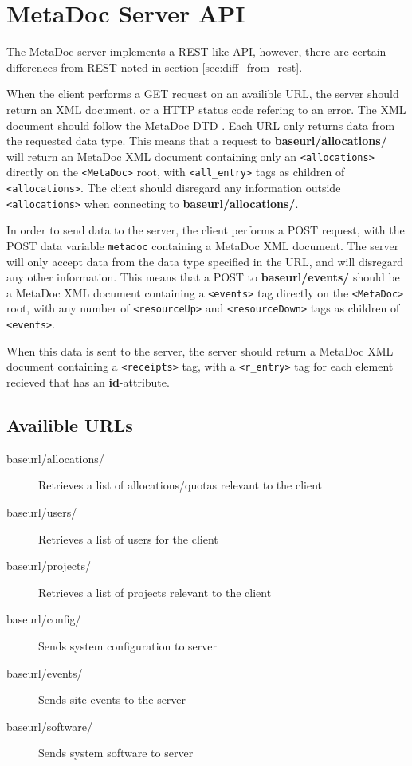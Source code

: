 \newpage
\section{MetaDoc Server API}
\label{sec:server_api}

The MetaDoc server implements a REST-like API, however, there are certain
differences from REST noted in section \ref{sec:diff_from_rest}.

When the client performs a GET request on an availible URL, the server should 
return an XML document, or a HTTP status code refering to an error. 
The XML document should follow the MetaDoc DTD \cite{metadoc_dtd}. Each URL
only returns data from the requested data type. This means that a request to
\textbf{baseurl/allocations/} will return an MetaDoc XML document containing
only an \texttt{<allocations>} directly on the \texttt{<MetaDoc>} root, with
\texttt{<all\_entry>} tags as children of \texttt{<allocations>}. The client
should disregard any information outside \texttt{<allocations>} when connecting
to \textbf{baseurl/allocations/}. 

In order to send data to the server, the client performs a POST request, with
the POST data variable \texttt{metadoc} containing a MetaDoc XML document. The
server will only accept data from the data type specified in the URL, and will
disregard any other information. This means that a POST to
\textbf{baseurl/events/} should be a MetaDoc XML document containing a 
\texttt{<events>} tag directly on the \texttt{<MetaDoc>} root, with any number
of \texttt{<resourceUp>} and \texttt{<resourceDown>} tags as children of
\texttt{<events>}. 

When this data is sent to the server, the server should return a MetaDoc XML
document containing a \texttt{<receipts>} tag, with a \texttt{<r\_entry>} tag
for each element recieved that has an \textbf{id}-attribute. 

\subsection{Availible URLs}

\begin{description}
    \item[baseurl/allocations/] Retrieves a list of allocations/quotas relevant
        to the client
    \item[baseurl/users/] Retrieves a list of users for the client
    \item[baseurl/projects/] Retrieves a list of projects relevant to the
        client
    \item[baseurl/config/] Sends system configuration to server
    \item[baseurl/events/] Sends site events to the server
    \item[baseurl/software/] Sends system software to server
\end{description}

